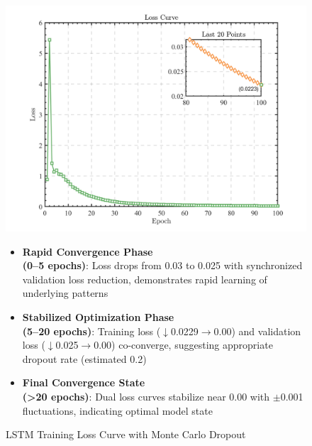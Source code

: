 \documentclass{mcmthesis}
\begin{document}
\begin{figure}[H]
	\centering
	\begin{adjustbox}{minipage=0.5\textwidth,valign=t}
		\centering
		\includegraphics[width=\linewidth]{fig/loss.png}
		\caption{LSTM Training Loss Curve with Monte Carlo Dropout}
		\label{fig:training_curve}
	\end{adjustbox}
	\hfill
	\begin{adjustbox}{minipage=0.45\textwidth,valign=t}
		\vspace*{-1.2ex} %
		\begin{itemize}
			\item \textbf{Rapid Convergence Phase \\(0--5 epochs)}: 
			Loss drops from 0.03 to 0.025 with synchronized validation loss reduction, demonstrates rapid learning of underlying patterns
			
			\item \textbf{Stabilized Optimization Phase \\(5--20 epochs)}: 
			Training loss ($\downarrow$0.0229$\rightarrow$0.00) and validation loss ($\downarrow$0.025$\rightarrow$0.00) co-converge, suggesting appropriate dropout rate (estimated 0.2)
			
			\item \textbf{Final Convergence State \\(>20 epochs)}: 
			Dual loss curves stabilize near 0.00 with $\pm$0.001 fluctuations, indicating optimal model state
		\end{itemize}
	\end{adjustbox}
\end{figure}
\end{document}
